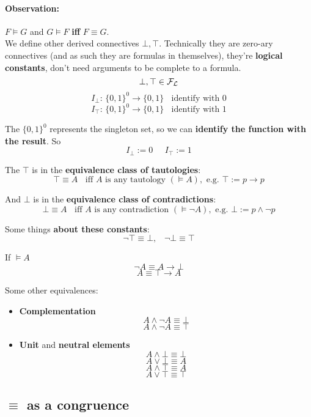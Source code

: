 \documentclass[11pt]{article}
\begin{document}
	\paragraph{Observation:} $F \models G$ and $G \models F$ \textbf{iff} $F \equiv G$.\\
	
	We define other derived connectives $\bot, \top$. Technically they are zero-ary connectives (and as such they are formulas in themselves), they're \textbf{logical constants}, don't need arguments to be complete to a formula.\\
	$$ \bot, \top \in \mathcal{F}_\mathcal{L} $$
	$$ I_\bot: \, \{0,1\}^0 \rightarrow \{0,1\}\;\; \text{ identify with } 0$$ 
	$$I_\top: \, \{0,1\}^0 \rightarrow \{0,1\} \;\; \text{ identify with } 1$$
	
	The $\{0,1\}^0$ represents the singleton set, so we can \textbf{identify the function with the result}. So 
	$$ I_\bot := 0 \;\;\;\;\; I_\top := 1$$
	
	The $\top$ is in the \textbf{equivalence class of tautologies}:
	$$ \top \equiv A \;\; \text{ iff } A \text{ is any tautology } (\models A), \text{ e.g. } \top := p \rightarrow p$$
	
	And $\bot$ is in the \textbf{equivalence class of contradictions}:
	$$ \bot \equiv A \;\; \text{ iff } A \text{ is any contradiction } (\models \neg A), \text{ e.g. } \bot := p \wedge \neg p$$
	
	\newpage
	
	Some things \textbf{about these constants}:
	$$ \neg \top \equiv \bot, \;\;\; \neg \bot \equiv \top $$
	 
	If $\models A$
	$$ \neg A \equiv A \rightarrow \bot $$
	$$ A \equiv \top \rightarrow A $$
	
	Some other equivalences:
	\begin{itemize}
		\item \textbf{Complementation}
		$$ A \wedge \neg A \equiv \bot $$
		$$ A \wedge \neg A \equiv \top $$
		
		\item \textbf{Unit} and \textbf{neutral elements}
		$$ A \wedge \bot \equiv \bot $$
		$$ A \vee \bot \equiv A $$
		$$ A \wedge \top \equiv A $$
		$$ A \vee \top \equiv \top $$
	\end{itemize}
	
	\newpage
	
	\subsection{$\equiv$ as a congruence}
	
\end{document}
